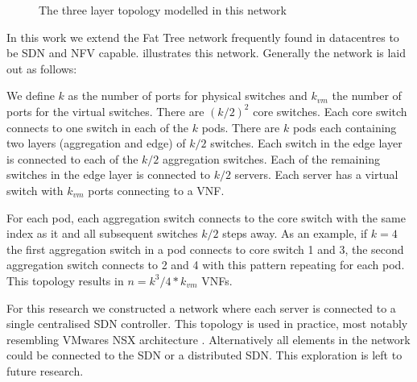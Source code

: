 \begin{figure}

\caption{The three layer topology modelled in this network}

\end{figure}

In this work we extend the Fat Tree network \cite{} frequently found in datacentres \cite{} to be SDN and NFV capable.  illustrates this network. Generally the network is laid out as follows:

We define $k$ as the number of ports for physical switches and $k_{vm}$ the number of ports for the virtual switches. There are $(k/2)^2$ core switches. Each core switch connects to one switch in each of the $k$ pods. There are $k$ pods each containing two layers (aggregation and edge) of $k/2$ switches. Each switch in the edge layer is connected to each of the $k/2$ aggregation switches. Each of the remaining switches in the edge layer is connected to $k/2$ servers. Each server has a virtual switch with $k_{vm}$ ports connecting to a VNF.

For each pod, each aggregation switch connects to the core switch with the same index as it and all subsequent switches $k/2$ steps away. As an example, if $k=4$ the first aggregation switch in a pod connects to core switch 1 and 3, the second aggregation switch connects to 2 and 4 with this pattern repeating for each pod. This topology results in $n=k^3/4 * k_{vm}$ VNFs.

For this research we constructed a network where each server is connected to a single centralised SDN controller. This topology is used in practice, most notably resembling VMwares NSX architecture \cite{}. Alternatively all elements in the network could be connected to the SDN \cite{} or a distributed SDN. This exploration is left to future research.